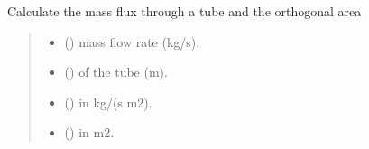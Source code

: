 \documentclass[letterpaper,10pt,english]{sphinxmanual}
\begin{document}
\begin{fulllineitems}
\label{\detokenize{fluid_properties_rp:fluid_properties_rp.mdot_area_function}}
\pysigstartsignatures
{}
\pysigstopsignatures
\sphinxAtStartPar
Calculate the mass flux through a tube and the orthogonal area
\begin{quote}\begin{description}
\begin{itemize}
\item {} 
\sphinxAtStartPar
{} () \textendash{} mass flow rate (kg/s).

\item {} 
\sphinxAtStartPar
{} () \textendash{} of the tube (m).

\end{itemize}

\sphinxAtStartPar
\begin{itemize}
\item {} 
\sphinxAtStartPar
{} () \textendash{} in kg/(s m2).

\item {} 
\sphinxAtStartPar
{} () \textendash{} in m2.

\end{itemize}


\end{description}\end{quote}

\end{fulllineitems}

\end{document}
